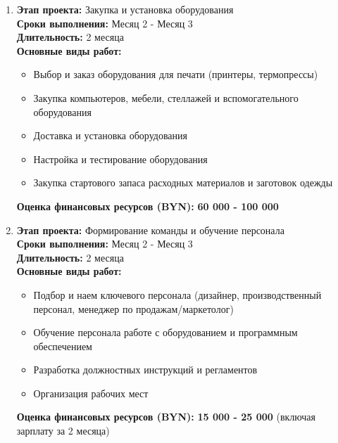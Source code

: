 \begin{enumerate}
    \item \textbf{Этап проекта:} Закупка и установка оборудования \\
        \textbf{Сроки выполнения:} Месяц 2 - Месяц 3 \\
        \textbf{Длительность:} 2 месяца \\
        \textbf{Основные виды работ:}
        \begin{itemize}
            \item Выбор и заказ оборудования для печати (принтеры, термопрессы)
            \item Закупка компьютеров, мебели, стеллажей и вспомогательного оборудования
            \item Доставка и установка оборудования
            \item Настройка и тестирование оборудования
            \item Закупка стартового запаса расходных материалов и заготовок одежды
        \end{itemize}
        \textbf{Оценка финансовых ресурсов (BYN):} \textbf{60 000 - 100 000}
        \vspace{0.2cm}

    \item \textbf{Этап проекта:} Формирование команды и обучение персонала \\
        \textbf{Сроки выполнения:} Месяц 2 - Месяц 3 \\
        \textbf{Длительность:} 2 месяца \\
        \textbf{Основные виды работ:}
        \begin{itemize}
            \item Подбор и наем ключевого персонала (дизайнер, производственный персонал, менеджер по продажам/маркетолог)
            \item Обучение персонала работе с оборудованием и программным обеспечением
            \item Разработка должностных инструкций и регламентов
            \item Организация рабочих мест
        \end{itemize}
        \textbf{Оценка финансовых ресурсов (BYN):} \textbf{15 000 - 25 000} (включая зарплату за 2 месяца)
        \vspace{0.2cm}


\end{enumerate}
